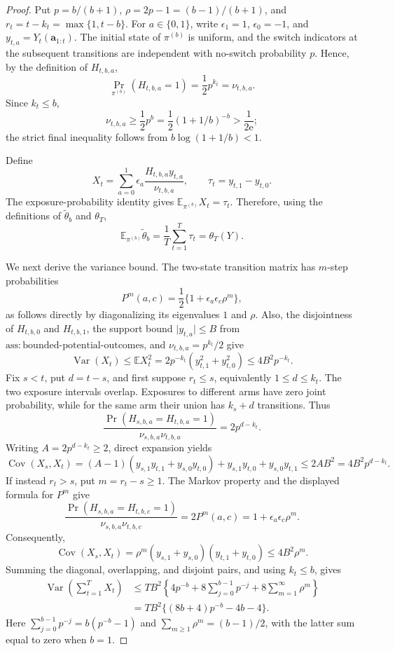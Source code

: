 \documentclass{article}
\begin{document}
\begin{proof}
Put \(p=b/(b+1)\), \(\rho=2p-1=(b-1)/(b+1)\), and \(r_t=t-k_t=\max\{1,t-b\}\).  For \(a\in\{0,1\}\), write \(\epsilon_1=1\), \(\epsilon_0=-1\), and \(y_{t,a}=Y_t(\mathbf a_{1:t})\).  The initial state of \(\pi^{(b)}\) is uniform, and the switch indicators at the subsequent transitions are independent with no-switch probability \(p\).  Hence, by the definition of \(H_{t,b,a}\),
\[
 \Pr_{\pi^{(b)}}(H_{t,b,a}=1)=\frac12p^{k_t}=\nu_{t,b,a}.
\]
Since \(k_t\le b\),
\[
 \nu_{t,b,a}\ge \frac12p^b
 =\frac12(1+1/b)^{-b}>\frac1{2\mathrm e};
\]
the strict final inequality follows from \(b\log(1+1/b)<1\).

Define
\[
 X_t=\sum_{a=0}^1\epsilon_a\frac{H_{t,b,a}y_{t,a}}{\nu_{t,b,a}},
 \qquad \tau_t=y_{t,1}-y_{t,0}.
\]
The exposure-probability identity gives \(\mathbb E_{\pi^{(b)}}X_t=\tau_t\).  Therefore, using the definitions of \(\widetilde\theta_b\) and \(\theta_T\),
\[
 \mathbb E_{\pi^{(b)}}\widetilde\theta_b
 =\frac1T\sum_{t=1}^T\tau_t=\theta_T(Y).
\]

We next derive the variance bound.  The two-state transition matrix has \(m\)-step probabilities
\[
 P^m(a,c)=\frac12\{1+\epsilon_a\epsilon_c\rho^m\},
\]
as follows directly by diagonalizing its eigenvalues \(1\) and \(\rho\).  Also, the disjointness of \(H_{t,b,0}\) and \(H_{t,b,1}\), the support bound \(\lvert y_{t,a}\rvert\le B\) from \(\mathrm{ass{:}bounded\mbox{-}potential\mbox{-}outcomes}\), and \(\nu_{t,b,a}=p^{k_t}/2\) give
\[
 \operatorname{Var}(X_t)\le \mathbb E X_t^2
 =2p^{-k_t}(y_{t,1}^2+y_{t,0}^2)
 \le4B^2p^{-k_t}.
\]
Fix \(s<t\), put \(d=t-s\), and first suppose \(r_t\le s\), equivalently \(1\le d\le k_t\).  The two exposure intervals overlap.  Exposures to different arms have zero joint probability, while for the same arm their union has \(k_s+d\) transitions.  Thus
\[
 \frac{\Pr(H_{s,b,a}=H_{t,b,a}=1)}{\nu_{s,b,a}\nu_{t,b,a}}
 =2p^{d-k_t}.
\]
Writing \(A=2p^{d-k_t}\ge2\), direct expansion yields
\[
 \operatorname{Cov}(X_s,X_t)
 =(A-1)(y_{s,1}y_{t,1}+y_{s,0}y_{t,0})
   +y_{s,1}y_{t,0}+y_{s,0}y_{t,1}
 \le 2AB^2=4B^2p^{d-k_t}.
\]
If instead \(r_t>s\), put \(m=r_t-s\ge1\).  The Markov property and the displayed formula for \(P^m\) give
\[
 \frac{\Pr(H_{s,b,a}=H_{t,b,c}=1)}{\nu_{s,b,a}\nu_{t,b,c}}
 =2P^m(a,c)=1+\epsilon_a\epsilon_c\rho^m.
\]
Consequently,
\[
 \operatorname{Cov}(X_s,X_t)
 =\rho^m(y_{s,1}+y_{s,0})(y_{t,1}+y_{t,0})
 \le4B^2\rho^m.
\]
Summing the diagonal, overlapping, and disjoint pairs, and using \(k_t\le b\), gives
\[
\begin{aligned}
 \operatorname{Var}\!\left(\sum_{t=1}^T X_t\right)
 &\le TB^2\left\{4p^{-b}
       +8\sum_{j=0}^{b-1}p^{-j}
       +8\sum_{m=1}^{\infty}\rho^m\right\}\\
 &=TB^2\{(8b+4)p^{-b}-4b-4\}.
\end{aligned}
\]
Here \(\sum_{j=0}^{b-1}p^{-j}=b(p^{-b}-1)\) and \(\sum_{m\ge1}\rho^m=(b-1)/2\), with the latter sum equal to zero when \(b=1\).


\end{proof}
\end{document}
